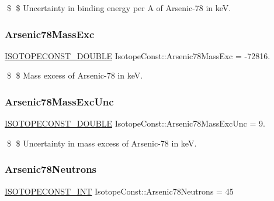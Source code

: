 \$ \$ Uncertainty in binding energy per A of Arsenic-\/78 in keV. \mbox{\label{group___isotope_const-_arsenic-_as78_ga1612693ce19b2066721253e60006be0a}} 
\subsubsection{\texorpdfstring{Arsenic78\+Mass\+Exc}{Arsenic78MassExc}}
{\footnotesize\ttfamily \mbox{\hyperlink{group___isotope_const-_macros_ga8f45a7272ce02c0b4c65c44636ed719a}{I\+S\+O\+T\+O\+P\+E\+C\+O\+N\+S\+T\+\_\+\+D\+O\+U\+B\+LE}} Isotope\+Const\+::\+Arsenic78\+Mass\+Exc = -\/72816.}

\$ \$ Mass excess of Arsenic-\/78 in keV. \mbox{\label{group___isotope_const-_arsenic-_as78_ga7a0dc3287bc9e69d2ee42fe2873f37fb}} 
\subsubsection{\texorpdfstring{Arsenic78\+Mass\+Exc\+Unc}{Arsenic78MassExcUnc}}
{\footnotesize\ttfamily \mbox{\hyperlink{group___isotope_const-_macros_ga8f45a7272ce02c0b4c65c44636ed719a}{I\+S\+O\+T\+O\+P\+E\+C\+O\+N\+S\+T\+\_\+\+D\+O\+U\+B\+LE}} Isotope\+Const\+::\+Arsenic78\+Mass\+Exc\+Unc = 9.}

\$ \$ Uncertainty in mass excess of Arsenic-\/78 in keV. \mbox{\label{group___isotope_const-_arsenic-_as78_ga1fa1c598ae4bb36c65893069a6392d63}} 
\subsubsection{\texorpdfstring{Arsenic78\+Neutrons}{Arsenic78Neutrons}}
{\footnotesize\ttfamily \mbox{\hyperlink{group___isotope_const-_macros_ga5f18360b3e99483a35c32d789e62621c}{I\+S\+O\+T\+O\+P\+E\+C\+O\+N\+S\+T\+\_\+\+I\+NT}} Isotope\+Const\+::\+Arsenic78\+Neutrons = 45}

